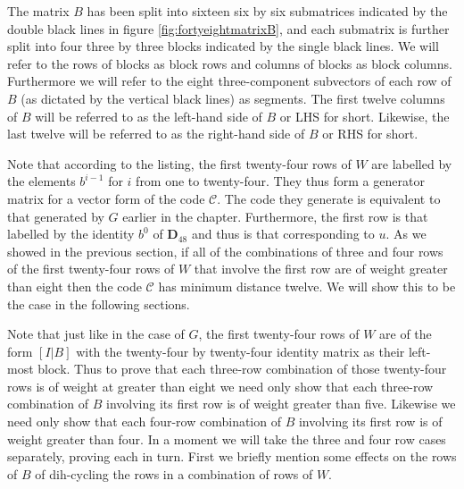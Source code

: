 The matrix $B$ has been split into sixteen six by six submatrices indicated by the double black lines in figure \ref{fig:fortyeightmatrixB}, and each submatrix is further split into four three by three blocks indicated by the single black lines.
We will refer to the rows of blocks as block rows and columns of blocks as block columns.
Furthermore we will refer to the eight three-component subvectors of each row of $B$ (as dictated by the vertical black lines) as segments.
The first twelve columns of $B$ will be referred to as the left-hand side of $B$ or LHS for short.
Likewise, the last twelve will be referred to as the right-hand side of $B$ or RHS for short.

Note that according to the listing, the first twenty-four rows of $W$ are labelled by the elements $b^{i-1}$ for $i$ from one to twenty-four.
They thus form a generator matrix for a vector form of the code $\mathcal{C}$.
The code they generate is equivalent to that generated by $G$ earlier in the chapter.
Furthermore, the first row is that labelled by the identity $b^0$ of $\mathbf{D}_{48}$ and thus is that corresponding to $u$.
As we showed in the previous section, if all of the combinations of three and four rows of the first twenty-four rows of $W$ that involve the first row are of weight greater than eight then the code $\mathcal{C}$ has minimum distance twelve.
We will show this to be the case in the following sections.

Note that just like in the case of $G$, the first twenty-four rows of $W$ are of the form $[I|B]$ with the twenty-four by twenty-four identity matrix as their left-most block.
Thus to prove that each three-row combination of those twenty-four rows is of weight at greater than eight we need only show that each three-row combination of $B$ involving its first row is of weight greater than five.
Likewise we need only show that each four-row combination of $B$ involving its first row is of weight greater than four.
In a moment we will take the three and four row cases separately, proving each in turn.
First we briefly mention some effects on the rows of $B$ of dih-cycling the rows in a combination of rows of $W$.

